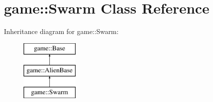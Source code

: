 \hypertarget{classgame_1_1Swarm}{}\section{game\+:\+:Swarm Class Reference}
\label{classgame_1_1Swarm}
Inheritance diagram for game\+:\+:Swarm\+:\begin{figure}[H]
\begin{center}
\leavevmode
\includegraphics[height=3.000000cm]{classgame_1_1Swarm}
\end{center}
\end{figure}
